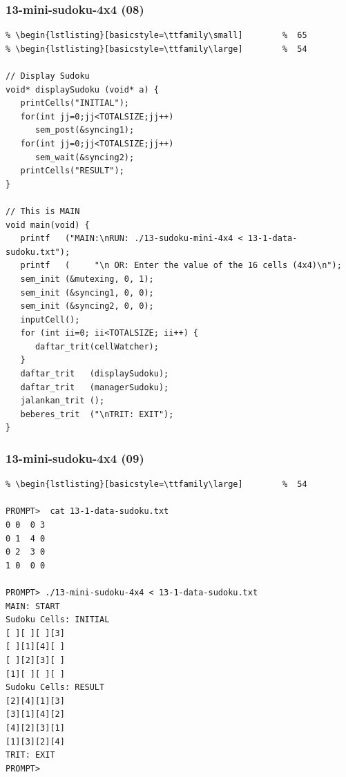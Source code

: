 \documentclass[xcolor=table, notheorems, hyperref={pdfpagelabels=false}]{beamer}
\begin{document}
\begin{frame}[fragile]
\frametitle{13-mini-sudoku-4x4 (08)}
\begin{lstlisting}[basicstyle=\ttfamily\tiny]         % 108
% \begin{lstlisting}[basicstyle=\ttfamily\footnotesize] %  72
% \begin{lstlisting}[basicstyle=\ttfamily\small]        %  65
% \begin{lstlisting}[basicstyle=\ttfamily\large]        %  54

// Display Sudoku
void* displaySudoku (void* a) {
   printCells("INITIAL");
   for(int jj=0;jj<TOTALSIZE;jj++) 
      sem_post(&syncing1);
   for(int jj=0;jj<TOTALSIZE;jj++) 
      sem_wait(&syncing2);
   printCells("RESULT");
}

// This is MAIN
void main(void) {
   printf   ("MAIN:\nRUN: ./13-sudoku-mini-4x4 < 13-1-data-sudoku.txt");
   printf   (     "\n OR: Enter the value of the 16 cells (4x4)\n");
   sem_init (&mutexing, 0, 1);
   sem_init (&syncing1, 0, 0);
   sem_init (&syncing2, 0, 0);
   inputCell();
   for (int ii=0; ii<TOTALSIZE; ii++) {
      daftar_trit(cellWatcher);
   }
   daftar_trit   (displaySudoku);
   daftar_trit   (managerSudoku);
   jalankan_trit ();
   beberes_trit  ("\nTRIT: EXIT");
}

\end{lstlisting}
\end{frame}

\begin{frame}[fragile]
\frametitle{13-mini-sudoku-4x4 (09)}
\begin{lstlisting}[basicstyle=\ttfamily\footnotesize] %  72
% \begin{lstlisting}[basicstyle=\ttfamily\small]        %  65
% \begin{lstlisting}[basicstyle=\ttfamily\large]        %  54

PROMPT>  cat 13-1-data-sudoku.txt 
0 0  0 3
0 1  4 0
0 2  3 0
1 0  0 0

PROMPT> ./13-mini-sudoku-4x4 < 13-1-data-sudoku.txt
MAIN: START
Sudoku Cells: INITIAL
[ ][ ][ ][3]
[ ][1][4][ ]
[ ][2][3][ ]
[1][ ][ ][ ]
Sudoku Cells: RESULT
[2][4][1][3]
[3][1][4][2]
[4][2][3][1]
[1][3][2][4]
TRIT: EXIT
PROMPT>

\end{lstlisting}
\end{frame}
\end{document}
